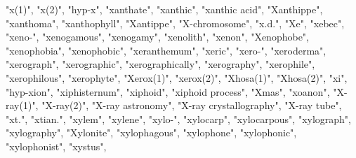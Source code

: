 "x(1)",
"x(2)",
"hyp-x",
"xanthate",
"xanthic",
"xanthic acid",
"Xanthippe",
"xanthoma",
"xanthophyll",
"Xantippe",
"X-chromosome",
"x.d.",
"Xe",
"xebec",
"xeno-",
"xenogamous",
"xenogamy",
"xenolith",
"xenon",
"Xenophobe",
"xenophobia",
"xenophobic",
"xeranthemum",
"xeric",
"xero-",
"xeroderma",
"xerograph",
"xerographic",
"xerographically",
"xerography",
"xerophile",
"xerophilous",
"xerophyte",
"Xerox(1)",
"xerox(2)",
"Xhosa(1)",
"Xhosa(2)",
"xi",
"hyp-xion",
"xiphisternum",
"xiphoid",
"xiphoid process",
"Xmas",
"xoanon",
"X-ray(1)",
"X-ray(2)",
"X-ray astronomy",
"X-ray crystallography",
"X-ray tube",
"xt.",
"xtian.",
"xylem",
"xylene",
"xylo-",
"xylocarp",
"xylocarpous",
"xylograph",
"xylography",
"Xylonite",
"xylophagous",
"xylophone",
"xylophonic",
"xylophonist",
"xystus",
